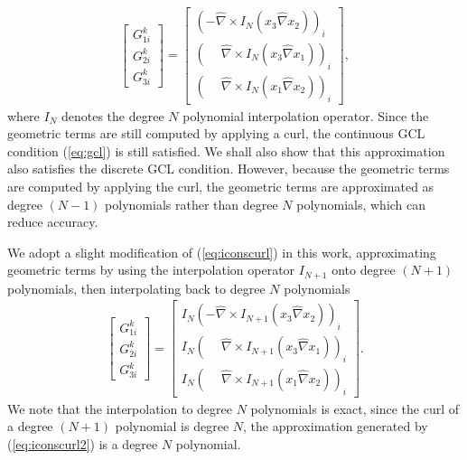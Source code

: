 \documentclass[10pt]{amsart}
\theoremstyle{definition}
\theoremstyle{lemma}
\theoremstyle{theorem}
\theoremstyle{assumption}
\renewcommand{\hat}{\widehat}
\newcommand{\LRs}[1]{\left[ #1 \right]}
\begin{document}
{\begin{align}
\LRs{\begin{array}{c}
G^k_{1i}\\
G^k_{2i}\\
G^k_{3i}\end{array}} =
\LRs{\begin{array}{c}
    {\left(         - \hat{\nabla} \times I_N\left(x_3 \hat{\nabla} x_2\right)\right)}_i\\
    {\left(\phantom{-}\hat{\nabla} \times I_N\left(x_3 \hat{\nabla} x_1\right)\right)}_i\\
    {\left(\phantom{-}\hat{\nabla} \times I_N\left(x_1 \hat{\nabla} x_2\right)\right)}_i\end{array}},
\label{eq:iconscurl}
\end{align}
where $I_N$ denotes the degree $N$ polynomial interpolation operator. Since the geometric terms are still computed by applying a curl, the continuous GCL condition (\ref{eq:gcl}) is still satisfied. We shall also show that this approximation also satisfies the discrete GCL condition. However, because the geometric terms are computed by applying the curl, the geometric terms are approximated as degree $(N-1)$ polynomials rather than degree $N$ polynomials, which can reduce accuracy.  

We adopt a slight modification of (\ref{eq:iconscurl}) in this work, approximating geometric terms by using the interpolation operator $I_{N+1}$ onto degree $(N+1)$ polynomials, then interpolating back to degree $N$ polynomials 
\begin{align}
\LRs{\begin{array}{c}
G^k_{1i}\\
G^k_{2i}\\
G^k_{3i}\end{array}} =
\LRs{\begin{array}{c}
    I_N{\left(         - \hat{\nabla} \times I_{N+1}\left(x_3 \hat{\nabla} x_2\right)\right)}_i\\
    I_N{\left(\phantom{-}\hat{\nabla} \times I_{N+1}\left(x_3 \hat{\nabla} x_1\right)\right)}_i\\
    I_N{\left(\phantom{-}\hat{\nabla} \times I_{N+1}\left(x_1 \hat{\nabla} x_2\right)\right)}_i\end{array}}.
\label{eq:iconscurl2}
\end{align}
We note that the interpolation to degree $N$ polynomials is exact, since the curl of a degree $(N+1)$ polynomial is degree $N$, the approximation generated by (\ref{eq:iconscurl2}) is a degree $N$ polynomial.  

}
\end{document}
